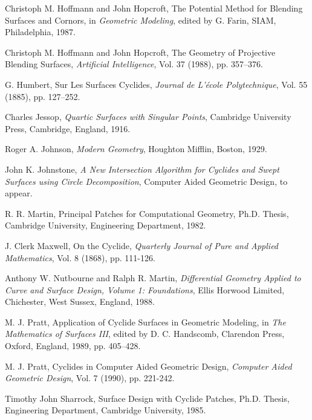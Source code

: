 \begin{thebibliography}{999}
     Christoph M. Hoffmann and John Hopcroft,
     The Potential Method for Blending Surfaces and Cornors,
     in {\em Geometric Modeling}, edited by G. Farin,
     SIAM, Philadelphia, 1987.

     Christoph M. Hoffmann and John Hopcroft,
     The Geometry of Projective Blending Surfaces,
     {\em Artificial Intelligence},
     Vol. 37 (1988), pp. 357--376.

     G. Humbert,
     Sur Les Surfaces Cyclides,
     {\em Journal de L'\'{e}cole Polytechnique},
     Vol. 55 (1885), pp. 127--252.

     Charles Jessop,
     {\em Quartic Surfaces with Singular Points},
     Cambridge University Press, Cambridge, England, 1916.

     Roger A. Johnson,
     {\em Modern Geometry},
     Houghton Mifflin, Boston, 1929.

     John K. Johnstone,
     {\em A New Intersection Algorithm for Cyclides and
	Swept Surfaces using Circle Decomposition},
     Computer Aided Geometric Design, to appear.

     R. R. Martin,
     Principal Patches for Computational Geometry,
     Ph.D. Thesis,
     Cambridge University, Engineering Department, 1982.

     J. Clerk Maxwell,
     On the Cyclide,
     {\em Quarterly Journal of Pure and Applied Mathematics},
     Vol. 8 (1868), pp. 111-126.

     Anthony W. Nutbourne and Ralph R. Martin,
     {\em Differential Geometry Applied to Curve and Surface Design, 
          Volume 1: Foundations},
     Ellis Horwood Limited, Chichester, West Sussex, England, 1988.

     M. J. Pratt,
     Application of Cyclide Surfaces in Geometric Modeling,
     in {\em The Mathematics of Surfaces III},
     edited by D. C. Handscomb,
     Clarendon Press, Oxford, England, 1989, pp. 405--428.

     M. J. Pratt,
     Cyclides in Computer Aided Geometric Design,
     {\em Computer Aided Geometric Design},
     Vol. 7 (1990), pp. 221-242.

     Timothy John Sharrock,
     Surface Design with Cyclide Patches,
     Ph.D. Thesis,
     Engineering Department, Cambridge University, 1985.


\end{thebibliography}
